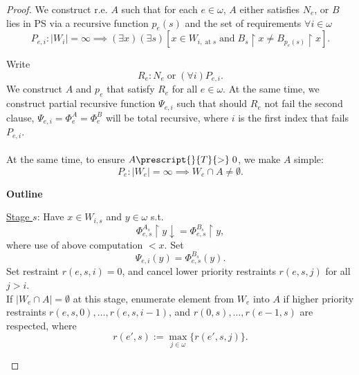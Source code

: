   \begin{proof}
    We construct r.e. $A$ such that for each $e\in\omega$, $A$
    either satisfies $N_e$, or $B$ lies in PS via a recursive function
    $p_e(s)$ and the set of requirements $\forall i\in\omega$
    \[P_{e,i}: |W_i|=\infty \implies (\exists x)(\exists s) [x\in
    W_{i,\; \text{at}\; s}\; \text{and}\; B_s\restriction x \neq B_{p_e(s)}
    \restriction x].\]

    Write
    \[R_e: N_e\; \text{or}\; (\forall i)P_{e,i}.\]
    We construct $A$ and $p_e$ that satisfy $R_e$ for all $e\in\omega$. At
    the same time, we construct partial recursive function $\Psi_{e,i}$
    such that should $R_e$ not fail the second clause,
    $\Psi_{e,i}=\Phi_e^A=\Phi_e^B$ will be total recursive, where $i$ is
    the first index that fails $P_{e,i}$.\\

    \\

    At the same time, to ensure $A\prescript{}{T}{>}\;0$, we make $A$
    simple:
    \[P_e: |W_e|=\infty \implies W_e\cap A\neq\emptyset.\]

    \textbf{Outline}
    \begin{tcolorbox}
      \underline{Stage $s$}: Have $x\in W_{i,s}$ and $y\in\omega$ s.t.
      \begin{equation}
        \Phi_{e,s}^{A_s}\restriction y \downarrow=
        \Phi_{e,s}^{B_s}\restriction y,
        \label{eqn:restraint}
      \end{equation}
      where use of above computation $<x$. Set
      \begin{equation}
        \Psi_{e,i}(y)=\Phi_{e,s}^{B_s}(y).
        \label{eqn:Psi}
      \end{equation}
      Set restraint $r(e,s,i)=0$, and cancel lower priority restraints
      $r(e,s,j)$ for all $j>i$. \\

      If $|W_e\cap A|=\emptyset$ at this stage, enumerate element from
      $W_e$ into $A$ if higher priority restraints
      $r(e,s,0),\ldots,r(e,s,i-1)$, and $r(0,s),\ldots,r(e-1,s)$ are
      respected, where
      \[r(e',s):=\max_{j\in\omega}\{r(e',s,j)\}.\]


\end{tcolorbox}
\end{proof}
